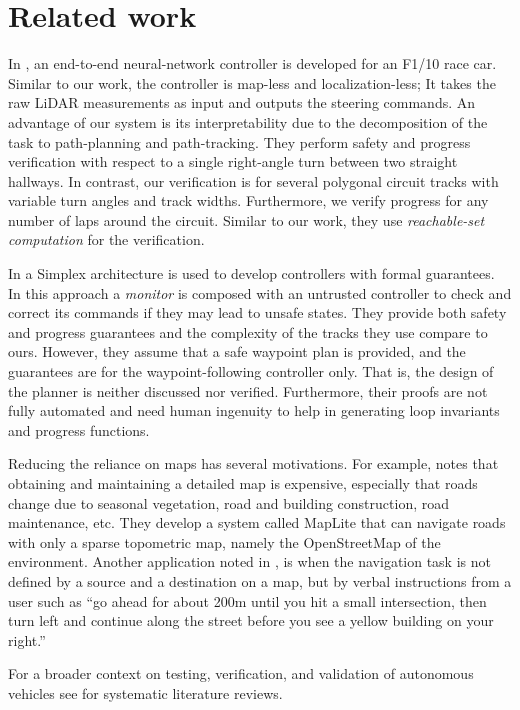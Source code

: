 \section{Related work}
\label{sec:relwork}
In \cite{Ivanov.2020, Ivanov-verifying.2020}, an end-to-end neural-network controller is developed for an F1/10 race car.
%
Similar to our work, the controller is map-less and localization-less;
%
It takes the raw LiDAR measurements as input and outputs the steering commands.
%
An advantage of our system is its interpretability due to the decomposition of the task to path-planning and path-tracking.
%
They perform safety and progress verification with respect to a single right-angle turn between two straight hallways.
%
In contrast, our verification is for several polygonal circuit tracks with variable turn angles and track widths.
%
Furthermore, we verify progress for any number of laps around the circuit.
%
Similar to our work, they use \emph{reachable-set computation} for the verification.



In \cite{Bohrer.2019} a Simplex architecture \cite{Seto.1998} is used to develop controllers with formal guarantees.
%
In this approach a \emph{monitor} is composed with an untrusted controller to check and correct its commands if they may lead to unsafe states.
%
They provide both safety and progress guarantees and the complexity of the tracks they use compare to ours.
%
However, they assume that a safe waypoint plan is provided, and the guarantees are for the waypoint-following controller only.
%
That is, the design of the planner is neither discussed nor verified.
%
Furthermore, their proofs are not fully automated and need human ingenuity to help in generating loop invariants and progress functions.



Reducing the reliance on maps has several motivations.
%
For example, \cite{Ort.2019} notes that 
obtaining and maintaining a detailed map is expensive, especially that roads change due to seasonal vegetation, road and building construction, road maintenance, etc.
%
They develop a system called MapLite that can navigate roads with only a sparse topometric map, namely the OpenStreetMap of the environment.
%
Another application noted in \cite{Vasudevan.2021}, \cite{Deruyttere.2019} is when the navigation task is not defined by a source and a destination on a map, but by verbal instructions from a user such as ``go ahead for about 200m until you hit a small intersection, then turn left and continue along the street before you see a yellow building on your right.''


For a broader context on testing, verification, and validation of autonomous vehicles see \cite{Rajabli.2020, Zhang.2020} for systematic literature reviews.



